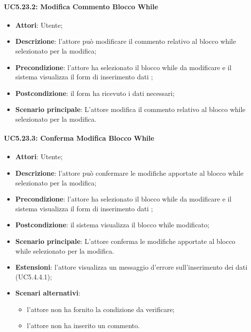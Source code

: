 \paragraph{UC5.23.2: Modifica Commento Blocco While}
\label{UC5.23.2}
\begin{itemize}
\item \textbf{Attori}: Utente;
\item \textbf{Descrizione}: l'attore può modificare il commento relativo al blocco while selezionato per la modifica;
\item \textbf{Precondizione}: l'attore ha selezionato il blocco while da modificare e il sistema visualizza il form di inserimento dati ;	
\item \textbf{Postcondizione}: il form ha ricevuto i dati necessari;	
\item \textbf{Scenario principale}:
L'attore modifica il commento relativo al blocco while selezionato per la modifica.
\end{itemize}
\paragraph{UC5.23.3: Conferma Modifica Blocco While}
\label{UC5.23.3}
\begin{itemize}
\item \textbf{Attori}: Utente;
\item \textbf{Descrizione}: l'attore può confermare le modifiche apportate al blocco while selezionato per la modifica;
\item \textbf{Precondizione}: l'attore ha selezionato il blocco while da modificare e il sistema visualizza il form di inserimento dati ;	
\item \textbf{Postcondizione}: il sistema visualizza il blocco while modificato;	
\item \textbf{Scenario principale}:
L'attore conferma le modifiche apportate al blocco while selezionato per la modifica.
\item \textbf{Estensioni}:
l'attore visualizza un messaggio d'errore sull'inserimento dei dati (UC5.4.4.1);	
\item \textbf{Scenari alternativi}:
\begin{itemize}
\item l'attore non ha fornito la condizione da verificare;
\item l'attore non ha inserito un commento.
\end{itemize}
\end{itemize}
